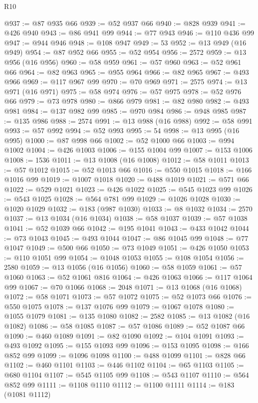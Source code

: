 \begin{lexlean}{R10}
\begin{coremodule}
@937 := @87 @935 @66
@939 := @52 @937 @66
@940 := @828 @939
@941 := @426 @940
@943 := @86 @941 @99
@944 := @77 @943
@946 := @110 @436 @99
@947 := @944 @946
@948 := @108 @947
@949 := 53
@952 := @13 @949 (@16 @949)
@954 := @87 @952 @66
@955 := @52 @954
@956 := 2572
@959 := @13 @956 (@16 @956)
@960 := @58 @959
@961 := @57 @960
@963 := @52 @961 @66
@964 := @82 @963
@965 := @955 @964
@966 := @82 @965
@967 := @493 @966
@969 := @117 @967 @99
@970 := @70 @969
@971 := 2575
@974 := @13 @971 (@16 @971)
@975 := @58 @974
@976 := @57 @975
@978 := @52 @976 @66
@979 := @73 @978
@980 := @866 @979
@981 := @82 @980
@982 := @493 @981
@984 := @137 @982 @99
@985 := @970 @984
@986 := @948 @985
@987 := @135 @986
@988 := 2574
@991 := @13 @988 (@16 @988)
@992 := @58 @991
@993 := @57 @992
@994 := @52 @993
@995 := 54
@998 := @13 @995 (@16 @995)
@1000 := @87 @998 @66
@1002 := @52 @1000 @66
@1003 := @994 @1002
@1004 := @426 @1003
@1006 := @155 @1004 @99
@1007 := @153 @1006
@1008 := 1536
@1011 := @13 @1008 (@16 @1008)
@1012 := @58 @1011
@1013 := @57 @1012
@1015 := @52 @1013 @66
@1016 := @550 @1015
@1018 := @166 @1016 @99
@1019 := @1007 @1018
@1020 := @488 @1019
@1021 := @571 @66
@1022 := @529 @1021
@1023 := @426 @1022
@1025 := @545 @1023 @99
@1026 := @543 @1025
@1028 := @564 @781 @99
@1029 := @1026 @1028
@1030 := @1020 @1029
@1032 := @183 (@987 @1030)
@1033 := @8 @1032
@1034 := 2570
@1037 := @13 @1034 (@16 @1034)
@1038 := @58 @1037
@1039 := @57 @1038
@1041 := @52 @1039 @66
@1042 := @195 @1041
@1043 := @433 @1042
@1044 := @73 @1043
@1045 := @493 @1044
@1047 := @86 @1045 @99
@1048 := @77 @1047
@1049 := @500 @66
@1050 := @73 @1049
@1051 := @426 @1050
@1053 := @110 @1051 @99
@1054 := @1048 @1053
@1055 := @108 @1054
@1056 := 2580
@1059 := @13 @1056 (@16 @1056)
@1060 := @58 @1059
@1061 := @57 @1060
@1063 := @52 @1061 @816
@1064 := @426 @1063
@1066 := @117 @1064 @99
@1067 := @70 @1066
@1068 := 2048
@1071 := @13 @1068 (@16 @1068)
@1072 := @58 @1071
@1073 := @57 @1072
@1075 := @52 @1073 @66
@1076 := @550 @1075
@1078 := @137 @1076 @99
@1079 := @1067 @1078
@1080 := @1055 @1079
@1081 := @135 @1080
@1082 := 2582
@1085 := @13 @1082 (@16 @1082)
@1086 := @58 @1085
@1087 := @57 @1086
@1089 := @52 @1087 @66
@1090 := @460 @1089
@1091 := @82 @1090
@1092 := @104 @1091
@1093 := @493 @1092
@1095 := @155 @1093 @99
@1096 := @153 @1095
@1098 := @166 @852 @99
@1099 := @1096 @1098
@1100 := @488 @1099
@1101 := @828 @66
@1102 := @460 @1101
@1103 := @446 @1102
@1104 := @65 @1103
@1105 := @680 @1104
@1107 := @545 @1105 @99
@1108 := @543 @1107
@1110 := @564 @852 @99
@1111 := @1108 @1110
@1112 := @1100 @1111
@1114 := @183 (@1081 @1112)

\end{coremodule}
\end{lexlean}
